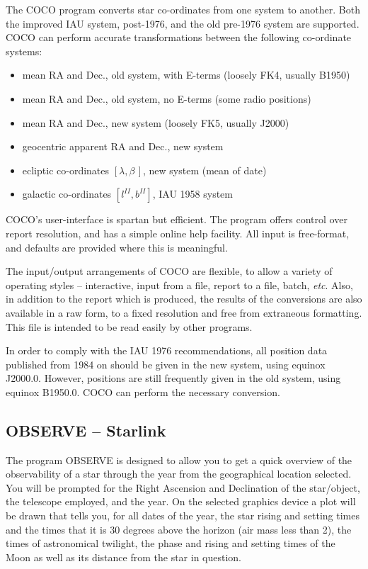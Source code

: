 \documentclass[twoside,11pt]{article}
\newcommand{\htmladdnormallink}[2]{#1}
\newcommand{\xref}[3]{#1}
\newcommand{\xlabel}[1]{}
\newcommand{\COCOref}{\xref{COCO}{sun56}{}}
\newcommand{\OBSERVEref}{\xref{OBSERVE}{sun146}{}}
\newcommand{\STARLINKref}{\htmladdnormallink{Starlink}{http://www.starlink.ac.uk/}}
\begin{document}
The {\COCOref} program converts star co-ordinates from one system to another.  Both
the improved IAU system, post-1976, and the old pre-1976 system are
supported. COCO can perform accurate transformations between the following
co-ordinate systems:

\begin{itemize}
\item mean RA and Dec., old system, with E-terms (loosely FK4, usually B1950)
\item mean RA and Dec., old system, no E-terms (some radio positions)
\item mean RA and Dec., new system (loosely FK5, usually J2000)
\item geocentric apparent RA and Dec., new system
\item ecliptic co-ordinates $[\lambda,\beta\,]$, new system (mean of date)
\item galactic co-ordinates $[l^{II},b^{II}]$, IAU 1958 system
\end{itemize}

{\COCOref}'s user-interface is spartan but efficient.  The program offers control
over report resolution, and has a simple online help facility. All
input is free-format, and defaults are provided where this is meaningful.

The input/output arrangements of COCO are flexible, to allow a variety of
operating styles -- interactive, input from a file, report to a file, batch,
{\it etc}. Also, in addition to the report which is produced, the results of
the conversions are also available in a raw form, to a fixed resolution and
free from extraneous formatting.
This file is intended to be read easily by other programs.

In order to comply with the IAU 1976 recommendations, all position data
published from 1984 on should be given in the new system, using equinox
J2000.0. However, positions are still frequently given in the old system,
using equinox B1950.0. COCO can perform the necessary conversion.


\subsection{{\OBSERVEref} -- {\STARLINKref}} \xlabel{OBSERVE}
\label{sec:observe}

The program {\OBSERVEref} is designed to allow you to get a quick overview
of the observability of a star through the year from the geographical
location selected. You will be prompted for the Right Ascension and Declination
of the star/object, the telescope employed, and the year. On the selected
graphics device a
plot will be drawn that tells you, for all dates of the year, the star rising
and setting times and the times that it is 30 degrees above the horizon
(air mass less than 2), the
times of astronomical twilight, the phase and rising and setting times of the
Moon as well as its distance from the star in question.
\end{document}

